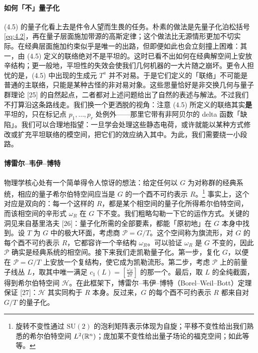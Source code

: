 \paragraph{如何「不」量子化}
(4.5) 的量子化看上去是件令人望而生畏的任务。朴素的做法是先量子化泊松括号 \eqref{eq:4.2}，再在量子层面施加带源的高斯定律；这个做法比无源情形更加不切实际。在经典层面施加约束似乎是唯一的出路，但即便如此也会立刻撞上困难：其一，由 (4.5) 定义的联络绝对不是平坦的。这时已看不出如何在经典解空间上安放辛结构；更一般地，平坦性的失效会使我们几何机器的一大片随之崩坏。更令人担忧的是，(4.5) 中出现的生成元 $T^a$ 并不对易。于是它们定义的「联络」不可能是普通的主联络，只能是某种古怪的非对易对象。这些思量恰好是非交换几何与量子群理论 [25] 的自然起点，二者都对上述问题给出了自然的表述与解法。不过我们不打算沿这条路线走。我们换一个更洒脱的视角：注意 (4.5) 所定义的联络其实\textbf{是}平坦的，只在标记点 $p_1,\dots,p_r$ 处例外——那里它带有非阿贝尔的 delta 函数「缺陷」。我们可以合理地指望：一旦学会处理这些静态电荷，或许就能以某种方式修改或扩充平坦联络的模空间，把它们的效应纳入其中。为此，我们需要绕一小段路。


\paragraph{博雷尔–韦伊–博特}
物理学核心处有一个简单得令人惊讶的想法：给定任何以 $G$ 为对称群的经典系统，相应的量子希尔伯特空间应当是 $G$ 的一个酉不可约表示 $R$。\footnote{旋转不变性通过 $\mathrm{SU}(2)$ 的泡利矩阵表示体现为自旋；平移不变性给出我们熟悉的希尔伯特空间 $L^2(\mathbb{R}^n)$；庞加莱不变性给出量子场论的福克空间；如此等等。} 事实上，这个对应是双向的：每一个这样的 $R$，都是某个相空间的量子化所得希尔伯特空间，而该相空间的辛形式 $\omega_R$ 在 $G$ 下不变。我们粗略勾勒一下它的运作方式。关键的洞见来自基里洛夫 [26]：量子化所需的全部要素，都能「原初地」在 $G$ 本身中找到。设 $T$ 为 $G$ 中的极大环面，考虑商 $\mathcal{P}=G/T$。这个空间称为旗流形，对 $G$ 的每个酉不可约表示 $R$，它都容许一个辛结构 $\omega_R$。可以验证 $\omega_R$ 是 $G$ 不变的，因此 $\mathcal{P}$ 确实是经典系统的相空间。接下来我们走凯勒量子化。第一步，复化 $G$，以便在 $\mathcal{P}=G/T$ 上安放一个复结构，使它成为凯勒流形。第二步，考虑 $\mathcal{P}$ 上的前量子线丛 $L$，取其中唯一满足 $c_1(L)=\left[\frac{\omega_R}{2\pi}\right]$ 的那一个。最后，取 $L$ 的全纯截面，得到希尔伯特空间 $\mathcal{H}$。在此框架下，博雷尔–韦伊–博特（Borel--Weil--Bott）定理保证 [27]：$\mathcal{H}$ 其实同构于 $R$ 本身。反过来，$G$ 的每个酉不可约表示 $R$ 都来自对 $G/T$ 的量子化。

